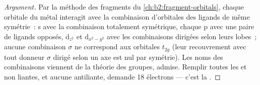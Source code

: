 \begin{proof}[Argument]
Par la méthode des fragments du \cref{ch:b2:fragment-orbitals}, chaque orbitale du métal interagit
avec la combinaison d'orbitales des ligands de même symétrie~: s avec la combinaison totalement
symétrique, chaque p avec une paire de ligands opposés, $\mathrm d_{z^2}$ et $\mathrm
d_{x^2-y^2}$ avec les combinaisons dirigées selon leurs lobes~; aucune combinaison $\sigma$
ne correspond aux orbitales $t_{2g}$ (leur recouvrement avec tout donneur $\sigma$ dirigé selon un axe
est nul par symétrie). Les noms des combinaisons viennent de la théorie des groupes, admise.
Remplir toutes les  et non liantes, et aucune antiliante, demande
18 électrons --- c'est la .
\end{proof}

